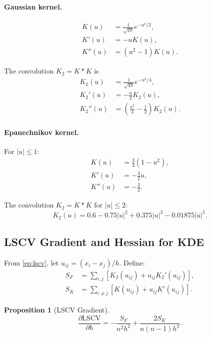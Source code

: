 \documentclass[11pt]{article}
\newtheorem{proposition}[theorem]{Proposition}
\theoremstyle{definition}
\theoremstyle{remark}
\begin{document}
\paragraph{Gaussian kernel.}
\begin{align}
    K(u) &= \frac{1}{\sqrt{2\pi}} e^{-u^2/2}, \\
    K'(u) &= -u K(u), \\
    K''(u) &= (u^2 - 1) K(u).
\end{align}

The convolution $K_2 = K * K$ is
\begin{align}
    K_2(u) &= \frac{1}{\sqrt{4\pi}} e^{-u^2/4}, \\
    K_2'(u) &= -\frac{u}{2} K_2(u), \\
    K_2''(u) &= \left( \frac{u^2}{4} - \frac{1}{2} \right) K_2(u).
\end{align}

\paragraph{Epanechnikov kernel.}
For $|u| \leq 1$:
\begin{align}
    K(u) &= \frac{3}{4}(1 - u^2), \\
    K'(u) &= -\frac{3}{2} u, \\
    K''(u) &= -\frac{3}{2}.
\end{align}

The convolution $K_2 = K * K$ for $|u| \leq 2$:
\begin{equation}
    K_2(u) = 0.6 - 0.75|u|^2 + 0.375|u|^3 - 0.01875|u|^5.
\end{equation}

\subsection{LSCV Gradient and Hessian for KDE}

From \eqref{eq:lscv}, let $u_{ij} = (x_i - x_j)/h$. Define:
\begin{align}
    S_F &= \sum_{i,j} \left[ K_2(u_{ij}) + u_{ij} K_2'(u_{ij}) \right], \\
    S_K &= \sum_{i \neq j} \left[ K(u_{ij}) + u_{ij} K'(u_{ij}) \right].
\end{align}

\begin{proposition}[LSCV Gradient]
\begin{equation}
    \frac{\partial \mathrm{LSCV}}{\partial h} = -\frac{S_F}{n^2 h^2} + \frac{2 S_K}{n(n-1) h^2}.
\end{equation}
\end{proposition}
\end{document}
